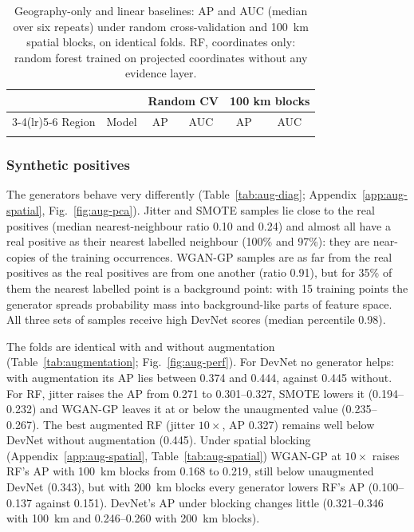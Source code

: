\documentclass[pdflatex,sn-apa]{sn-jnl}
\begin{document}
\begin{table}[t]
\caption{Geography-only and linear baselines: AP and AUC (median over six repeats) under random cross-validation and 100~km spatial blocks, on identical folds. RF, coordinates only: random forest trained on projected coordinates without any evidence layer.}\label{tab:geography}
\footnotesize
\setlength{\tabcolsep}{3pt}
\begin{tabular*}{\textwidth}{@{\extracolsep\fill}llcccc}
\toprule
 & & \multicolumn{2}{c}{Random CV} & \multicolumn{2}{c}{100 km blocks} \\
\cmidrule(lr){3-4}\cmidrule(lr){5-6}
Region & Model & AP & AUC & AP & AUC \\
\midrule
\botrule
\end{tabular*}
\end{table}

\subsubsection{Synthetic positives}\label{sec:res-augmentation}

The generators behave very differently (Table~\ref{tab:aug-diag}; Appendix~\ref{app:aug-spatial}, Fig.~\ref{fig:aug-pca}). Jitter and SMOTE samples lie close to the real positives (median nearest-neighbour ratio 0.10 and 0.24) and almost all have a real positive as their nearest labelled neighbour (100\% and 97\%): they are near-copies of the training occurrences. WGAN-GP samples are as far from the real positives as the real positives are from one another (ratio 0.91), but for 35\% of them the nearest labelled point is a background point: with 15 training points the generator spreads probability mass into background-like parts of feature space. All three sets of samples receive high DevNet scores (median percentile 0.98).

The folds are identical with and without augmentation (Table~\ref{tab:augmentation}; Fig.~\ref{fig:aug-perf}). For DevNet no generator helps: with augmentation its AP lies between 0.374 and 0.444, against 0.445 without. For RF, jitter raises the AP from 0.271 to 0.301--0.327, SMOTE lowers it (0.194--0.232) and WGAN-GP leaves it at or below the unaugmented value (0.235--0.267). The best augmented RF (jitter $10\times$, AP 0.327) remains well below DevNet without augmentation (0.445). Under spatial blocking (Appendix~\ref{app:aug-spatial}, Table~\ref{tab:aug-spatial}) WGAN-GP at $10\times$ raises RF's AP with 100~km blocks from 0.168 to 0.219, still below unaugmented DevNet (0.343), but with 200~km blocks every generator lowers RF's AP (0.100--0.137 against 0.151). DevNet's AP under blocking changes little (0.321--0.346 with 100~km and 0.246--0.260 with 200~km blocks).
\end{document}

